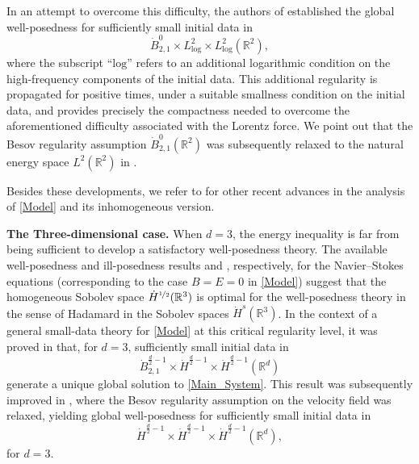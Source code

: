 \documentclass[11pt, leqno, a4paper,]{amsart}
\theoremstyle{remark}
\numberwithin{equation}{section}
\begin{document}
In an attempt to overcome this difficulty, the authors of \cite{IK2011} established the  global well-posedness for sufficiently small initial data in
\begin{equation*}
\dot B^0_{2,1}\times L^2_{\mathrm{log}}\times L^2_{\mathrm{log}}(\mathbb R^2),
\end{equation*}
where the subscript ``$\mathrm{log}$'' refers to an additional logarithmic condition on the high-frequency components of the initial data. This additional regularity is propagated for positive times, under a suitable smallness condition on the initial data, and provides precisely the compactness needed to overcome the aforementioned difficulty associated with the Lorentz force.
 We point out that the Besov regularity assumption $\dot B^0_{2,1}(\mathbb R^2)$ was subsequently relaxed to the natural energy space $L^2(\mathbb R^2)$ in \cite{GIM14}.

Besides these developments, we refer to \cite{a19, ag20, AHB24} for other recent advances in the analysis of \eqref{Model} and its inhomogeneous version.



\medskip
\noindent\textbf{The Three-dimensional case.}  
When $d=3$, the energy inequality is far from being sufficient to develop a satisfactory well-posedness theory. The available well-posedness and ill-posedness results \cite{FK64} and \cite{X24}, respectively, for the Navier--Stokes equations (corresponding to the case $B=E=0$ in \eqref{Model}) suggest that the homogeneous Sobolev space $\dot H^{\nicefrac{1}{2}}(\mathbb R^3)$ is optimal for the well-posedness theory in the sense of Hadamard in the Sobolev spaces $\dot H^{s}(\mathbb R^3)$.
 In the context of a general small-data theory for \eqref{Model} at this critical regularity level, it was proved in \cite{IK2011} that, for $d=3$, sufficiently small initial data in
\begin{equation*}
\dot B^{\frac{d}{2}-1}_{2,1}\times \dot H^{\frac{d}{2}-1}\times \dot H^{\frac{d}{2}-1}(\mathbb R^d)
\end{equation*}
generate a unique global solution to \eqref{Main_System}. This result was subsequently improved in \cite{GIM14}, where the Besov regularity assumption on the velocity field was relaxed, yielding global well-posedness for sufficiently small initial data in
\begin{equation*}
\dot H^{\frac{d}{2}-1}\times \dot H^{\frac{d}{2}-1}\times \dot H^{\frac{d}{2}-1}(\mathbb R^d),
\end{equation*}
for $d=3$. 
\end{document}
